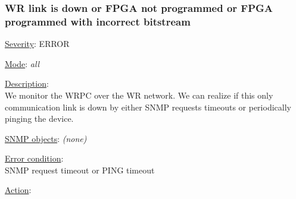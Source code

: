 \subsubsection{\bf WR link is down or FPGA not programmed or FPGA programmed with incorrect bitstream}
		\label{fail:timing:master_down}
		\begin{pck_descr}
			\item [] \underline{Severity}: ERROR
			\item [] \underline{Mode}: \emph{all}
			\item [] \underline{Description}:\\
				We monitor the WRPC over the WR network. We can realize if this only
				communication link is down by either SNMP requests timeouts or
				periodically pinging the device.
			\item [] \underline{SNMP objects}: \emph{(none)}
			\item [] \underline{Error condition}:\\
				{\footnotesize
				SNMP request timeout or PING timeout}
      \item [] \underline{Action}:\\
		\end{pck_descr}

